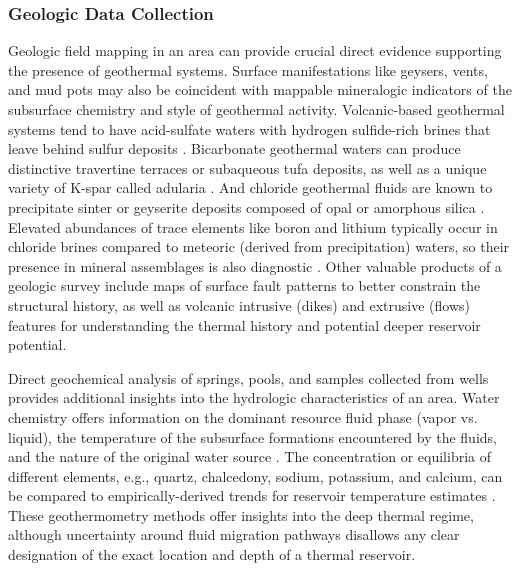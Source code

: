 \subsubsection{Geologic Data Collection}
Geologic field mapping in an area can provide crucial direct evidence supporting the presence of geothermal systems. Surface manifestations like geysers, vents, and mud pots may also be coincident with mappable mineralogic indicators of the subsurface chemistry and style of geothermal activity.  Volcanic-based geothermal systems tend to have acid-sulfate waters with hydrogen sulfide-rich brines that leave behind sulfur deposits \citep[~p. 123]{glassley_geothermal_2015}. Bicarbonate geothermal waters can produce distinctive travertine terraces or subaqueous tufa deposits, as well as a unique variety of K-spar called adularia \citep[~p. 125]{glassley_geothermal_2015}. And chloride geothermal fluids are known to precipitate sinter or geyserite deposits composed of opal or amorphous silica \citep[~p. 125]{glassley_geothermal_2015}. Elevated abundances of trace elements like boron and lithium typically occur in chloride brines compared to meteoric (derived from precipitation) waters, so their presence in mineral assemblages is also diagnostic \citep{bielicki_hydrogeolgic_2015, millot_multi-isotopic_2007}. Other valuable products of a geologic survey include maps of surface fault patterns to better constrain the structural history, as well as volcanic intrusive (dikes) and extrusive (flows) features for understanding the thermal history and potential deeper reservoir potential.

Direct geochemical analysis of springs, pools, and samples collected from wells provides additional insights into the hydrologic characteristics of an area. Water chemistry offers information on the dominant resource fluid phase (vapor vs. liquid), the temperature of the subsurface formations encountered by the fluids, and the nature of the original water source \citep[~p. 25]{dipippo_geothermal_2012}. The concentration or equilibria of different elements, e.g., quartz, chalcedony, sodium, potassium, and calcium, can be compared to empirically-derived trends for reservoir temperature estimates \citep[~p. 157]{glassley_geothermal_2015}. These geothermometry methods offer insights into the deep thermal regime, although uncertainty around fluid migration pathways disallows any clear designation of the exact location and depth of a thermal reservoir.

